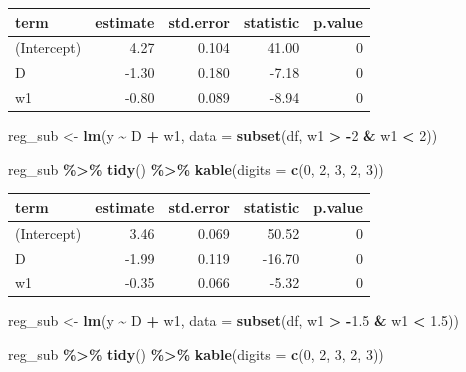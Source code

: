 \documentclass[
]{article}
\newenvironment{Shaded}{\begin{snugshade}}{\end{snugshade}}
\newcommand{\AttributeTok}[1]{\textcolor[rgb]{0.13,0.29,0.53}{#1}}
\newcommand{\DecValTok}[1]{\textcolor[rgb]{0.00,0.00,0.81}{#1}}
\newcommand{\FloatTok}[1]{\textcolor[rgb]{0.00,0.00,0.81}{#1}}
\newcommand{\FunctionTok}[1]{\textcolor[rgb]{0.13,0.29,0.53}{\textbf{#1}}}
\newcommand{\NormalTok}[1]{#1}
\newcommand{\OtherTok}[1]{\textcolor[rgb]{0.56,0.35,0.01}{#1}}
\newcommand{\SpecialCharTok}[1]{\textcolor[rgb]{0.81,0.36,0.00}{\textbf{#1}}}
\begin{document}
\begin{tabular}{l|r|r|r|r}
\hline
term & estimate & std.error & statistic & p.value\\
\hline
(Intercept) & 4.27 & 0.104 & 41.00 & 0\\
\hline
D & -1.30 & 0.180 & -7.18 & 0\\
\hline
w1 & -0.80 & 0.089 & -8.94 & 0\\
\hline
\end{tabular}

\begin{Shaded}
\begin{Highlighting}[]
\NormalTok{reg\_sub }\OtherTok{\textless{}{-}} \FunctionTok{lm}\NormalTok{(y }\SpecialCharTok{\textasciitilde{}}\NormalTok{ D }\SpecialCharTok{+}\NormalTok{ w1, }\AttributeTok{data =} \FunctionTok{subset}\NormalTok{(df, w1 }\SpecialCharTok{\textgreater{}} \SpecialCharTok{{-}}\DecValTok{2} \SpecialCharTok{\&}\NormalTok{ w1 }\SpecialCharTok{\textless{}} \DecValTok{2}\NormalTok{))}

\NormalTok{reg\_sub }\SpecialCharTok{\%\textgreater{}\%}
  \FunctionTok{tidy}\NormalTok{() }\SpecialCharTok{\%\textgreater{}\%}
  \FunctionTok{kable}\NormalTok{(}\AttributeTok{digits =} \FunctionTok{c}\NormalTok{(}\DecValTok{0}\NormalTok{, }\DecValTok{2}\NormalTok{, }\DecValTok{3}\NormalTok{, }\DecValTok{2}\NormalTok{, }\DecValTok{3}\NormalTok{))}
\end{Highlighting}
\end{Shaded}

\begin{tabular}{l|r|r|r|r}
\hline
term & estimate & std.error & statistic & p.value\\
\hline
(Intercept) & 3.46 & 0.069 & 50.52 & 0\\
\hline
D & -1.99 & 0.119 & -16.70 & 0\\
\hline
w1 & -0.35 & 0.066 & -5.32 & 0\\
\hline
\end{tabular}

\begin{Shaded}
\begin{Highlighting}[]
\NormalTok{reg\_sub }\OtherTok{\textless{}{-}} \FunctionTok{lm}\NormalTok{(y }\SpecialCharTok{\textasciitilde{}}\NormalTok{ D }\SpecialCharTok{+}\NormalTok{ w1, }\AttributeTok{data =} \FunctionTok{subset}\NormalTok{(df, w1 }\SpecialCharTok{\textgreater{}} \SpecialCharTok{{-}}\FloatTok{1.5} \SpecialCharTok{\&}\NormalTok{ w1 }\SpecialCharTok{\textless{}} \FloatTok{1.5}\NormalTok{))}

\NormalTok{reg\_sub }\SpecialCharTok{\%\textgreater{}\%}
  \FunctionTok{tidy}\NormalTok{() }\SpecialCharTok{\%\textgreater{}\%}
  \FunctionTok{kable}\NormalTok{(}\AttributeTok{digits =} \FunctionTok{c}\NormalTok{(}\DecValTok{0}\NormalTok{, }\DecValTok{2}\NormalTok{, }\DecValTok{3}\NormalTok{, }\DecValTok{2}\NormalTok{, }\DecValTok{3}\NormalTok{))}
\end{Highlighting}
\end{Shaded}
\end{document}
